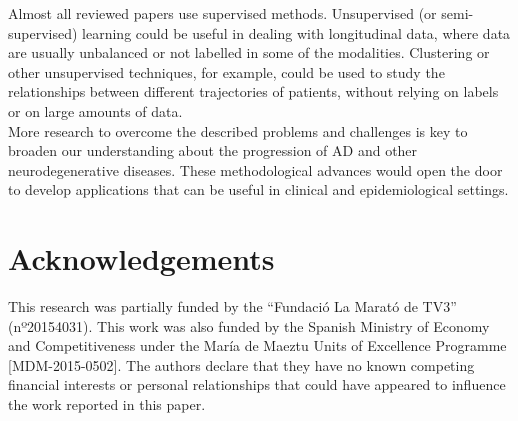 Almost all reviewed papers use supervised methods. Unsupervised (or semi-supervised) learning could be useful in dealing with longitudinal data, where data are usually unbalanced or not labelled in some of the modalities. Clustering or other unsupervised techniques, for example, could be used to study the relationships between different trajectories of patients, without relying on labels or on large amounts of data.  \\

More research to overcome the described problems and challenges is key to broaden our understanding about the progression of AD and other neurodegenerative diseases. These methodological advances would open the door to develop applications that can be useful in clinical and epidemiological settings.

\section*{Acknowledgements}
This research was partially funded by the “Fundació La Marató de TV3” (nº20154031). This work was also funded by the Spanish Ministry of Economy and Competitiveness under the María de Maeztu Units of Excellence Programme [MDM-2015-0502]. The authors declare that they have no known competing financial interests or personal relationships that could have appeared to influence the work reported in this paper.\\